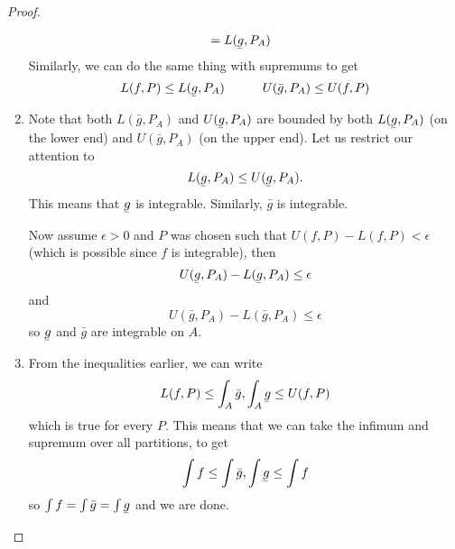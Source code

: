 \documentclass{article}
\newcommand{\ubar}[1]{\underaccent{\bar}{#1}}
\begin{document}
\begin{proof}
\begin{enumerate}
\begin{align}
                         & = L(\ubar{g},P_A)
              \end{align}
              Similarly, we can do the same thing with supremums to get
              \begin{equation}
                  L(f,P) \le L(\ubar{g}, P_A) \quad\quad\quad U(\bar{g}, P_A) \le U(f,P)
              \end{equation}
              \item Note that both $L(\bar{g},P_A)$ and $U(\ubar{g},P_A)$ are bounded by both $L(\ubar{g},P_A)$ (on the lower end) and $U(\bar{g},P_A)$ (on the upper end). Let us restrict our attention to
              \begin{equation}
                  L(\ubar{g}, P_A) \le U(\ubar{g}, P_A).
              \end{equation}
              This means that $\ubar{g}$ is integrable. Similarly, $\bar{g}$ is integrable.

              Now assume $\epsilon > 0$ and $P$ was chosen such that $U(f,P)-L(f,P) < \epsilon$ (which is possible since $f$ is integrable), then
              \begin{equation}
                  U(\ubar{g}, P_A) - L(\ubar{g}, P_A) \le \epsilon
              \end{equation}
              and 
              \begin{equation}
                    U(\bar{g}, P_A) - L(\bar{g}, P_A) \le \epsilon
              \end{equation}
              so $\ubar{g}$ and $\bar{g}$ are integrable on $A$.
              \item From the inequalities earlier, we can write  
              \begin{equation}
                  L(f,P) \le \int_A \bar{g}, \int_A \ubar{g} \le U(f,P)
              \end{equation}
              which is true for every $P$. This means that we can take the infimum and supremum over all partitions, to get
              \begin{equation}
                  \int f \le \int \bar{g}, \int \ubar{g} \le \int f
              \end{equation}
              so $\int f = \int \bar{g} = \int \ubar{g}$ and we are done.
    \end{enumerate}
\end{proof}
\end{document}
